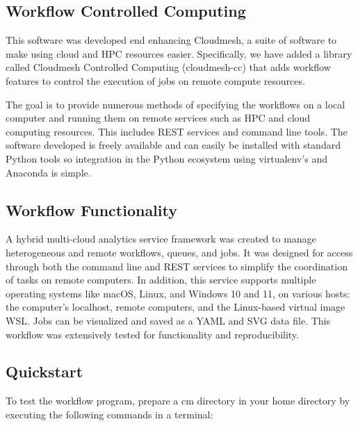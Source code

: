 \hypertarget{workflow-controlled-computing}{%
\subsection{Workflow Controlled
Computing}\label{workflow-controlled-computing}}

This software was developed end enhancing Cloudmesh, a suite of software
to make using cloud and HPC resources easier. Specifically, we have
added a library called Cloudmesh Controlled Computing (cloudmesh-cc)
that adds workflow features to control the execution of jobs on remote
compute resources.

The goal is to provide numerous methods of specifying the workflows on a
local computer and running them on remote services such as HPC and cloud
computing resources. This includes REST services and command line tools.
The software developed is freely available and can easily be installed
with standard Python tools so integration in the Python ecosystem using
virtualenv's and Anaconda is simple.

\hypertarget{workflow-functionality}{%
\subsection{Workflow Functionality}\label{workflow-functionality}}

A hybrid multi-cloud analytics service framework was created to manage
heterogeneous and remote workflows, queues, and jobs. It was designed
for access through both the command line and REST services to simplify
the coordination of tasks on remote computers. In addition, this service
supports multiple operating systems like macOS, Linux, and Windows 10
and 11, on various hosts: the computer's localhost, remote computers,
and the Linux-based virtual image WSL. Jobs can be visualized and saved
as a YAML and SVG data file. This workflow was extensively tested for
functionality and reproducibility.

\hypertarget{quickstart}{%
\subsection{Quickstart}\label{quickstart}}

To test the workflow program, prepare a cm directory in your home
directory by executing the following commands in a terminal:


